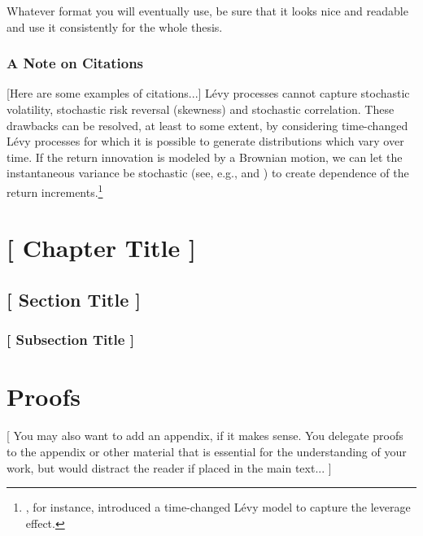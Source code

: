 \documentclass[11pt,a4paper,english,oneside]{book}
\numberwithin{equation}{chapter}
\begin{document}
Whatever format you will eventually use, be sure that it looks nice and readable and use it consistently for the whole thesis.


\subsection{A Note on Citations}

[Here are some examples of citations...] Lévy processes cannot capture stochastic volatility, stochastic risk reversal (skewness) and stochastic correlation. These drawbacks can be resolved, at least to some extent, by considering time-changed Lévy processes for which it is possible to generate distributions which vary over time. If the return innovation is modeled by a Brownian motion, we can let the instantaneous variance be stochastic (see, e.g., \cite{SH1993} and \cite{BA1996}) to create dependence of the return increments.\footnote{\cite{CW2004}, for instance, introduced a time-changed Lévy model to capture the leverage effect.}



\chapter{ [ Chapter Title ]}

\section{ [ Section Title ] }

\subsection{ [  Subsection Title ] }


\newpage

\appendix
\noappendicestocpagenum
\addappheadtotoc
\appendixpage



\renewcommand{\theequation}{A.\arabic{equation}}


\chapter{Proofs}

[ You may also want to add an appendix, if it makes sense. You delegate proofs to the appendix or other material that is essential for the understanding of your work, but would distract the reader if placed in the main text... ]
\end{document}
